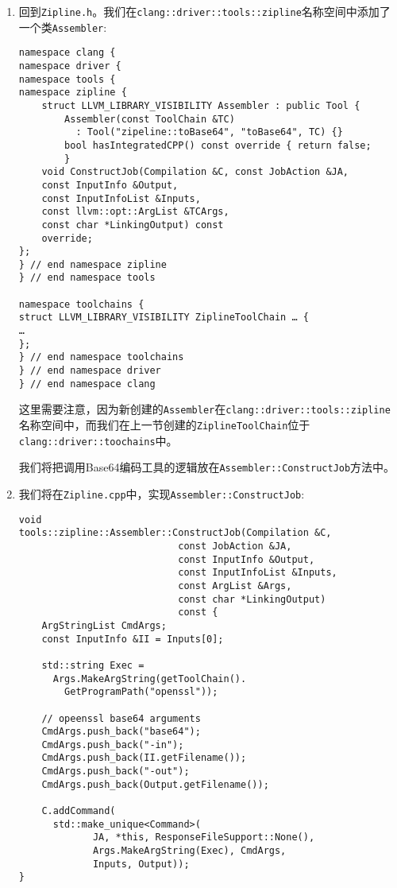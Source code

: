 \begin{enumerate}
\item 回到\texttt{Zipline.h}。我们在\texttt{clang::driver::tools::zipline}名称空间中添加了一个类\texttt{Assembler}:

\begin{lstlisting}[style=styleCXX]
namespace clang {
namespace driver {
namespace tools {
namespace zipline {
	struct LLVM_LIBRARY_VISIBILITY Assembler : public Tool {
		Assembler(const ToolChain &TC)
		  : Tool("zipeline::toBase64", "toBase64", TC) {}
		bool hasIntegratedCPP() const override { return false;
		}
	void ConstructJob(Compilation &C, const JobAction &JA,
	const InputInfo &Output,
	const InputInfoList &Inputs,
	const llvm::opt::ArgList &TCArgs,
	const char *LinkingOutput) const
	override;
};
} // end namespace zipline
} // end namespace tools

namespace toolchains {
struct LLVM_LIBRARY_VISIBILITY ZiplineToolChain … {
…
};
} // end namespace toolchains
} // end namespace driver
} // end namespace clang
\end{lstlisting}

这里需要注意，因为新创建的\texttt{Assembler}在\texttt{clang::driver::tools::zipline}名称空间中，而我们在上一节创建的\texttt{ZiplineToolChain}位于\texttt{clang::driver::toochains}中。

我们将把调用Base64编码工具的逻辑放在\texttt{Assembler::ConstructJob}方法中。

\item 我们将在\texttt{Zipline.cpp}中，实现\texttt{Assembler::ConstructJob}:

\begin{lstlisting}[style=styleCXX]
void
tools::zipline::Assembler::ConstructJob(Compilation &C,
							const JobAction &JA,
							const InputInfo &Output,
							const InputInfoList &Inputs,
							const ArgList &Args,
							const char *LinkingOutput)
							const {
	ArgStringList CmdArgs;
	const InputInfo &II = Inputs[0];
	
	std::string Exec =
	  Args.MakeArgString(getToolChain().
	    GetProgramPath("openssl"));
	
	// opeenssl base64 arguments
	CmdArgs.push_back("base64");
	CmdArgs.push_back("-in");
	CmdArgs.push_back(II.getFilename());
	CmdArgs.push_back("-out");
	CmdArgs.push_back(Output.getFilename());
	
	C.addCommand(
	  std::make_unique<Command>(
	  		 JA, *this, ResponseFileSupport::None(),
	         Args.MakeArgString(Exec), CmdArgs,
             Inputs, Output));
}
\end{lstlisting}


\end{enumerate}
